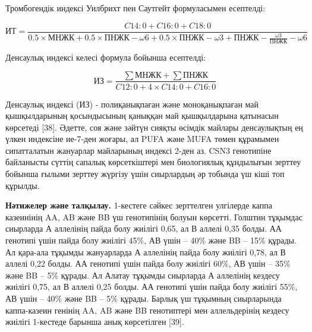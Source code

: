 Тромбогендік индексі Уилбрихт пен Саутгейт формуласымен есептелді:

\begin{equation}
  \text{ИТ} = \frac{C14:0 + C16:0 + C18:0}{0.5 \times \text{МНЖК} + 0.5 \times \text{ПНЖК}-\omega6 + 0.5 \times \text{ПНЖК}-\omega3 + \text{ПНЖК}-\frac{\omega3}{\text{ПНЖК}}-\omega6}
  \end{equation}

Денсаулық индексі келесі формула бойынша есептелді:

\begin{equation}
  \text{ИЗ} = \frac{\sum \text{МНЖК} + \sum \text{ПНЖК}}{C12:0 + 4 \times C14:0 + C16:0}
  \end{equation}


\begin{multicols}{2}
Денсаулық индексі (ИЗ) - полиқанықпаған және моноқанықпаған май
қышқылдарының қосындысының қаныққан май қышқылдарына қатынасын көрсетеді
{[}38{]}. Әдетте, соя және зәйтүн сияқты өсімдік майлары денсаулықтың ең
үлкен индексіне ие-7-ден жоғары, ал PUFA және MUFA төмен құрамымен
сипатталатын жануарлар майларының индексі 2-ден аз. CSN3 генотипіне
байланысты сүттің сапалық көрсеткіштері мен биологиялық құндылығын
зерттеу бойынша ғылыми зерттеу жүргізу үшін сиырлардың әр тобында үш
кіші топ құрылды.

{\bfseries Нәтижелер және талқылау.} 1-кестеге сәйкес зерттелген улгілерде
каппа казеинінің AA, AB және BB үш генотипінің болуын көрсетті. Голштин
тұқымдас сиырларда А аллелінің пайда болу жиілігі 0,65, ал В аллелі 0,35
болды. АА генотипі үшін пайда болу жиілігі 45\%, АВ үшін -- 40\% және BB
-- 15\% құрады. Ал қара-ала тұқымды жануарларда А аллелінің пайда болу
жиілігі 0,78, ал В аллелі 0,22 болды. АА генотипі үшін пайда болу
жиілігі 60\%, АВ үшін -- 35\% және BB -- 5\% құрады. Ал Алатау тұқымды
сиырларда А аллелінің кездесу жиілігі 0,75, ал В аллелі 0,25 болды. АА
генотипі үшін пайда болу жиілігі 55\%, АВ үшін -- 40\% және BB -- 5\%
құрады. Барлық үш тұқымның сиырларында каппа-казеин генінің AA, AB және
BB генотиптері мен аллельдерінің кездесу жиілігі 1-кестеде барынша анық
көрсетілген {[}39{]}.
\end{multicols}

